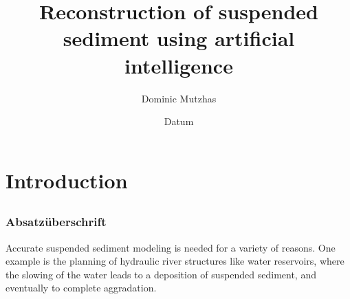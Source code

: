 %
% 
% 
%


\renewcommand{\Thema}{%
    Thema der Arbeit (optional)}

\usepackage{amsmath}




\title{Reconstruction of suspended sediment using artificial intelligence}
\author{Dominic Mutzhas}
\date{Datum}

\tableofcontents %

\chapter{Introduction}

\section{}

\subsection[]{Absatzüberschrift}
Accurate suspended sediment modeling is needed for a variety of reasons. One example is the planning of hydraulic river structures like water reservoirs, where the slowing of the water leads to a deposition of suspended sediment, and eventually to complete aggradation. 

